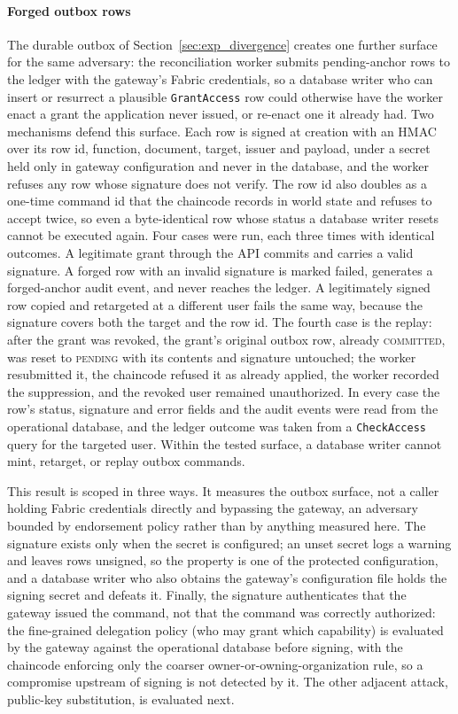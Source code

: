 \documentclass[preprint,12pt]{elsarticle}
\begin{document}
\paragraph{Forged outbox rows}
The durable outbox of Section~\ref{sec:exp_divergence} creates one further
surface for the same adversary: the reconciliation worker submits pending-anchor
rows to the ledger with the gateway's Fabric credentials, so a database
writer who can insert or resurrect a plausible \texttt{GrantAccess} row could
otherwise have the worker enact a grant the application never issued, or
re-enact one it already had. Two mechanisms defend this surface. Each row is signed at
creation with an HMAC over its row id, function, document, target, issuer and
payload, under a secret held only in gateway configuration and never in the
database, and the worker refuses any row whose signature does not verify. The
row id also doubles as a one-time command id that the chaincode records in
world state and refuses to accept twice, so even a byte-identical row whose
status a database writer resets cannot be executed again. Four cases were
run, each three times with identical outcomes. A legitimate grant through the
API commits and carries a valid signature. A forged row with an invalid
signature is marked failed, generates a forged-anchor audit event, and never
reaches the ledger. A legitimately signed row copied and retargeted at a
different user fails the same way, because the signature covers both the
target and the row id. The fourth case is the replay: after the grant was revoked, the
grant's original outbox row, already \textsc{committed}, was reset to \textsc{pending} with its contents
and signature untouched; the worker resubmitted it, the chaincode refused it
as already applied, the worker recorded the suppression, and the revoked user
remained unauthorized. In every case the row's status, signature and error
fields and the audit events were read from the operational database, and the
ledger outcome was taken from a \texttt{CheckAccess} query for the targeted
user. Within the tested surface, a database writer cannot
mint, retarget, or replay outbox commands.

This result is scoped in three ways. It measures the outbox surface, not a
caller holding Fabric credentials directly and bypassing the gateway, an
adversary bounded by endorsement policy rather than by anything measured
here. The signature exists only when the secret is configured; an unset
secret logs a warning and leaves rows unsigned, so the property is one of the
protected configuration, and a database writer who also obtains the gateway's
configuration file holds the signing secret and defeats it. Finally, the signature
authenticates that the gateway issued the command, not that the command was
correctly authorized: the fine-grained delegation policy (who may grant which
capability) is evaluated by the gateway against the operational database
before signing, with the chaincode enforcing only the coarser
owner-or-owning-organization rule, so a compromise upstream of signing is not
detected by it. The other adjacent attack, public-key substitution, is
evaluated next.
\end{document}
